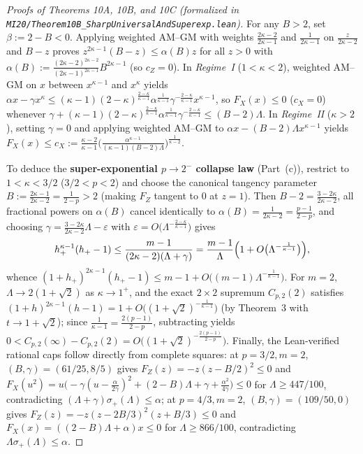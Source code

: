\documentclass[10pt,letterpaper]{article}
\begin{document}
\begin{proof}[Proofs of Theorems 10A, 10B, and 10C (formalized in \texttt{MI20/Theorem10B\_\allowbreak SharpUniversalAndSuperexp.lean})]
For any $B > 2$, set $\beta := 2 - B < 0$. Applying weighted AM--GM with weights $\frac{2\kappa-2}{2\kappa-1}$ and $\frac{1}{2\kappa-1}$ on $\frac{z}{2\kappa-2}$ and $B - z$ proves $z^{2\kappa-1}(B - z) \le \alpha(B) z$ for all $z > 0$ with $\alpha(B) := \frac{(2\kappa-2)^{2\kappa-2}}{(2\kappa-1)^{2\kappa-1}} B^{2\kappa-1}$ (so $c_Z = 0$). In \emph{Regime~I} ($1 < \kappa < 2$), weighted AM--GM on $x$ between $x^{\kappa-1}$ and $x^\kappa$ yields $\alpha x - \gamma x^\kappa \le (\kappa-1)(2-\kappa)^{\frac{2-\kappa}{\kappa-1}}\alpha^{\frac{1}{\kappa-1}}\gamma^{-\frac{2-\kappa}{\kappa-1}} x^{\kappa-1}$, so $F_X(x) \le 0$ ($c_X = 0$) whenever $\gamma + (\kappa-1)(2-\kappa)^{\frac{2-\kappa}{\kappa-1}}\alpha^{\frac{1}{\kappa-1}}\gamma^{-\frac{2-\kappa}{\kappa-1}} \le (B - 2)\Lambda$. In \emph{Regime~II} ($\kappa > 2$), setting $\gamma = 0$ and applying weighted AM--GM to $\alpha x - (B-2)\Lambda x^{\kappa-1}$ yields $F_X(x) \le c_X := \frac{\kappa-2}{\kappa-1}\bigl(\frac{\alpha^{\kappa-1}}{(\kappa-1)(B-2)\Lambda}\bigr)^{\frac{1}{\kappa-2}}$.

To deduce the \textbf{super-exponential $p \to 2^-$ collapse law} (Part~(c)), restrict to $1 < \kappa < 3/2$ ($3/2 < p < 2$) and choose the canonical tangency parameter $B := \frac{2\kappa-1}{2\kappa-2} = \frac{1}{2-p} > 2$ (making $F_Z$ tangent to $0$ at $z = 1$). Then $B - 2 = \frac{3 - 2\kappa}{2\kappa - 2}$, all fractional powers on $\alpha(B)$ cancel identically to $\alpha(B) = \frac{1}{2\kappa - 2} = \frac{p-1}{2-p}$, and choosing $\gamma = \frac{3 - 2\kappa}{2\kappa - 2}\Lambda - \varepsilon$ with $\varepsilon = O\bigl(\Lambda^{-\frac{2-\kappa}{\kappa-1}}\bigr)$ gives
\[
  h_+^{\kappa - 1}(h_+ - 1)
  \le \frac{m - 1}{(2\kappa - 2)(\Lambda + \gamma)}
  = \frac{m - 1}{\Lambda}\Bigl(1 + O\bigl(\Lambda^{-\frac{1}{\kappa-1}}\bigr)\Bigr),
\]
whence $(1 + h_+)^{2\kappa-1}(h_+ - 1) \le m - 1 + O\bigl((m-1)\Lambda^{-\frac{1}{\kappa-1}}\bigr)$. For $m = 2$, $\Lambda \to 2(1+\sqrt{2})$ as $\kappa \to 1^+$, and the exact $2\times 2$ supremum $C_{p,2}(2)$ satisfies $(1+h)^{2\kappa-1}(h-1) = 1 + O\bigl((1+\sqrt{2})^{-\frac{1}{\kappa-1}}\bigr)$ (by Theorem~3 with $t \to 1+\sqrt{2}$); since $\frac{1}{\kappa - 1} = \frac{2(p-1)}{2-p}$, subtracting yields $0 < C_{p,2}(\infty) - C_{p,2}(2) = O\bigl((1+\sqrt{2})^{-\frac{2(p-1)}{2-p}}\bigr)$. Finally, the Lean-verified rational caps follow directly from complete squares: at $p = 3/2, m = 2$, $(B, \gamma) = (61/25, 8/5)$ gives $F_Z(z) = -z(z - B/2)^2 \le 0$ and $F_X(u^2) = u\bigl(-\gamma(u - \frac{\alpha}{2\gamma})^2 + (2-B)\Lambda + \gamma + \frac{\alpha^2}{4\gamma}\bigr) \le 0$ for $\Lambda \ge 447/100$, contradicting $(\Lambda + \gamma)\sigma_+(\Lambda) \le \alpha$; at $p = 4/3, m = 2$, $(B, \gamma) = (109/50, 0)$ gives $F_Z(z) = -z(z - 2B/3)^2(z + B/3) \le 0$ and $F_X(x) = ((2-B)\Lambda + \alpha)x \le 0$ for $\Lambda \ge 866/100$, contradicting $\Lambda\sigma_+(\Lambda) \le \alpha$.


\end{proof}
\end{document}
